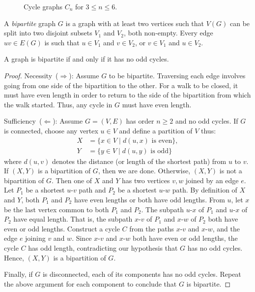 \begin{figure}[!htbp]
\centering

\caption{Cycle graphs $C_n$ for $3 \leq n \leq 6$.}
\label{fig:introduction:four_cycle_graphs}
\end{figure}

A \emph{bipartite} graph $G$ is a graph with at least two
vertices such that $V(G)$ can be split into two disjoint subsets $V_1$
and $V_2$, both non-empty. Every edge $uv \in E(G)$ is such that
$u \in V_1$ and $v \in V_2$, or $v \in V_1$ and $u \in V_2$.

\begin{theorem}
A graph is bipartite if and only if it has no odd cycles.
\end{theorem}

\begin{proof}
Necessity~($\Longrightarrow$): Assume $G$ to be bipartite. Traversing
each edge involves going from one side of the bipartition to the
other. For a walk to be closed, it must have even length in order to
return to the side of the bipartition from which the walk
started. Thus, any cycle in $G$ must have even length.

Sufficiency~($\Longleftarrow$): Assume $G = (V, E)$ has order
$n \geq 2$ and no odd cycles. If $G$ is connected, choose any vertex
$u \in V$ and define a partition of $V$ thus:
%
\begin{align*}
X &= \{x \in V \;|\; d(u,x) \text{ is even}\}, \\
Y &= \{y \in V \;|\; d(u,y) \text{ is odd}\}
\end{align*}
%
where $d(u,v)$ denotes the distance (or length of the shortest path)
from $u$ to $v$. If $(X, Y)$ is a bipartition of $G$, then we are
done. Otherwise, $(X, Y)$ is not a bipartition of $G$. Then one of $X$
and $Y$ has two vertices $v,w$ joined by an edge $e$. Let $P_1$ be a
shortest $u$-$v$ path and $P_2$ be a shortest $u$-$w$ path. By
definition of $X$ and $Y$, both $P_1$ and $P_2$ have even lengths or
both have odd lengths. From $u$, let $x$ be the last vertex common to
both $P_1$ and $P_2$. The subpath $u$-$x$ of $P_1$ and $u$-$x$ of
$P_2$ have equal length. That is, the subpath $x$-$v$ of $P_1$ and
$x$-$w$ of $P_2$ both have even or odd lengths. Construct a cycle $C$
from the paths $x$-$v$ and $x$-$w$, and the edge $e$ joining $v$ and
$w$. Since $x$-$v$ and $x$-$w$ both have even or odd lengths, the
cycle $C$ has odd length, contradicting our hypothesis that $G$ has no
odd cycles. Hence, $(X,Y)$ is a bipartition of $G$.

Finally, if $G$ is disconnected, each of its components has no odd
cycles. Repeat the above argument for each component to conclude that
$G$ is bipartite.
\end{proof}

